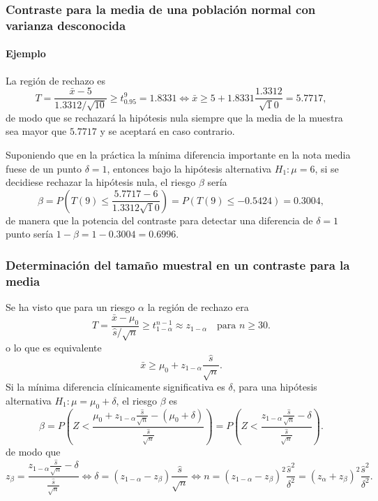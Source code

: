 \begin{frame}
\frametitle{Contraste para la media de una población normal con varianza desconocida}
\framesubtitle{Ejemplo}
La región de rechazo es
\[
T=\frac{\bar x-5}{1.3312/\sqrt{10}} \geq t^9_{0.95} = 1.8331 \Leftrightarrow \bar x \geq 5+1.8331\frac{1.3312}{\sqrt
10} = 5.7717,
\]
de modo que se rechazará la hipótesis nula siempre que la media de la muestra sea mayor que $5.7717$ y se aceptará en
caso contrario.

Suponiendo que en la práctica la mínima diferencia importante en la nota media fuese de un punto $\delta=1$, entonces
bajo la hipótesis alternativa $H_1:\mu=6$, si se decidiese rechazar la hipótesis nula, el riesgo $\beta$ sería 
\[
\beta = P\left(T(9)\leq \frac{5.7717-6}{1.3312\sqrt 10}\right) = P(T(9)\leq -0.5424) = 0.3004,
\]
de manera que la potencia del contraste para detectar una diferencia de $\delta=1$ punto sería $1-\beta=1-0.3004 =
0.6996$.
\end{frame}


\begin{frame}
\frametitle{Determinación del tamaño muestral en un contraste para la media}
Se ha visto que para un riesgo $\alpha$ la región de rechazo era
\[
T=\frac{\bar x-\mu_0}{\hat s/\sqrt{n}} \geq t^{n-1}_{1-\alpha} \approx z_{1-\alpha}\quad \text{para } n\geq 30.
\]
o lo que es equivalente 
\[
\bar x \geq \mu_0+z_{1-\alpha}\frac{\hat s}{\sqrt n}.
\]
Si la mínima diferencia clínicamente significativa es $\delta$, para una hipótesis alternativa $H_1:\mu=\mu_0+\delta$,
el riesgo $\beta$ es
\[
\beta = P\left(Z< \frac{\mu_0+z_{1-\alpha}\frac{\hat s}{\sqrt n}-(\mu_0+\delta)}{\frac{\hat s}{\sqrt n}} \right) =
P\left(Z< \frac{z_{1-\alpha}\frac{\hat s}{\sqrt n}-\delta}{\frac{\hat s}{\sqrt n}} \right).
\]
de modo que 
\[
z_\beta = \frac{z_{1-\alpha}\frac{\hat s}{\sqrt n}-\delta}{\frac{\hat s}{\sqrt n}} \Leftrightarrow \delta =
(z_{1-\alpha}-z_\beta)\frac{\hat s}{\sqrt n} \Leftrightarrow n =
(z_{1-\alpha}-z_\beta)^2\frac{\hat s^2}{\delta^2} = (z_\alpha+z_\beta)^2\frac{\hat s^2}{\delta^2}.
\]
\end{frame}


